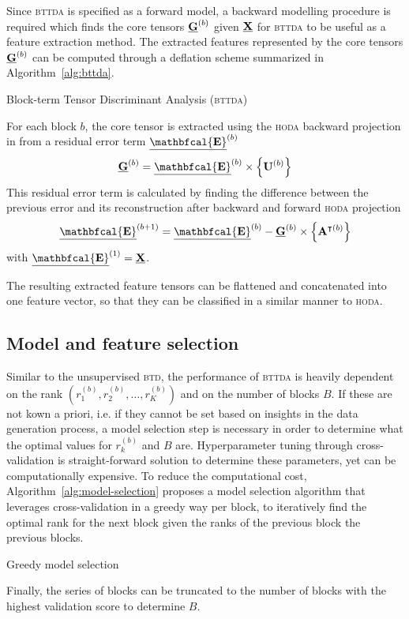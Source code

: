 \documentclass[twocolumn]{article}
\begin{document}
Since \textsc{bttda} is specified as a forward model, a backward modelling
procedure is required which finds the core tensors $\underline{\mathbf{G}}^{(b)}$ given $\underline{\mathbf{X}}$ for
\textsc{bttda} to be useful as a feature extraction method.
The extracted features represented by the core tensors $\underline{\mathbf{G}}^{(b)}$ can be
computed through a deflation scheme summarized in Algorithm~\ref{alg:bttda}.
\begin{algorithm}
  \caption{Block-term Tensor Discriminant Analysis (\textsc{bttda})}
  \label{alg:bttda}
  
\end{algorithm}
For each block $b$, the core tensor is extracted using the \textsc{hoda} backward
projection in from a residual error term
$\ten{\mathbfcal{E}}^{(b)}$
\begin{equation}
  \ten{G}^{(b)} = \ten{\mathbfcal{E}}^{(b)}\mmpr{\mat{U}^{(b)}}
\end{equation}
This residual error term is calculated by finding the difference between the
previous error and its reconstruction after backward and forward \textsc{hoda}
projection
\begin{equation}
  \ten{\mathbfcal{E}}^{(b+1)} = \ten{\mathbfcal{E}}^{(b)} - \ten{G}^{(b)}
  \mmpr{\mat{A}^{\intercal(b)}}
\end{equation}
with $\ten{\mathbfcal{E}}^{(1)}=\ten{X}$.

The resulting extracted feature tensors can be flattened and concatenated into
one feature vector, so that they can be classified in a similar manner to
\textsc{hoda}.


\subsection{Model and feature selection}
Similar to the unsupervised \textsc{btd}, the performance of \textsc{bttda} is
heavily dependent on the rank $\left(r_1^{(b)}, r_2^{(b)}, \ldots,
r_K^{(b)}\right)$ and on the number of blocks $B$.
If these are not kown a priori, i.e. if they cannot be set based on insights in the
data generation process, a model selection step is necessary in order to
determine what the optimal values for $r_k^{(b)}$ and $B$ are.
Hyperparameter tuning through cross-validation is straight-forward solution to
determine these parameters, yet can be computationally expensive.
To reduce the computational cost, Algorithm~\ref{alg:model-selection} proposes a model selection algorithm that leverages cross-validation in a greedy way per block, to iteratively find the
optimal rank for the next block given the ranks of the previous block the previous blocks.
\begin{algorithm}
  \caption{Greedy model selection}
  \label{alg:model-selection}
  
\end{algorithm}
Finally, the series of blocks can be truncated to the number of blocks with the
highest validation score to determine $B$.
\end{document}

